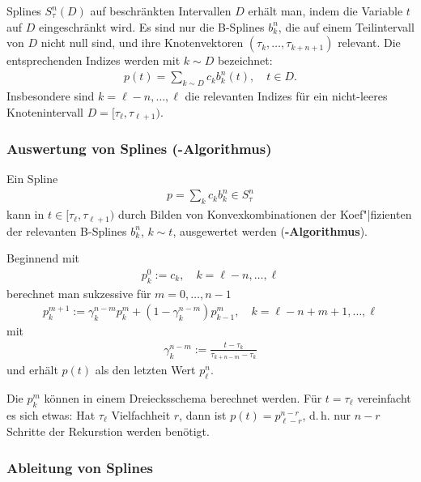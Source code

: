Splines $S_\tau^n(D)$ auf beschränkten Intervallen $D$ erhält man, indem die
Variable $t$ auf $D$ eingeschränkt wird.
Es sind nur die B-Splines $b_k^n$, die auf einem Teilintervall von $D$ nicht
null sind, und ihre Knotenvektoren $(\tau_k, \dotsc, \tau_{k+n+1})$ relevant.
Die entsprechenden Indizes werden mit $k \sim D$ bezeichnet:
\begin{align*}
    p(t) = \sum_{k \sim D} c_k b_k^n(t), \quad t \in D.
\end{align*}
Insbesondere sind $k = \ell - n, \dotsc, \ell$ die relevanten Indizes für ein
nicht-leeres Knotenintervall $D = [\tau_\ell, \tau_{\ell+1})$.

\subsubsection{%
    Auswertung von Splines (-Algorithmus)%
}

Ein Spline
\begin{align*}
    p = \sum_k c_k b_k^n \in S_\tau^n
\end{align*}
kann in $t \in [\tau_\ell, \tau_{\ell+1})$ durch Bilden von Konvexkombinationen
der Koef"|fizienten der relevanten B-Splines $b_k^n$, $k \sim t$,
ausgewertet werden
(\textbf{-Algorithmus}).

Beginnend mit
\begin{align*}
    p_k^0 := c_k, \quad
    k = \ell - n, \dotsc, \ell
\end{align*}
berechnet man sukzessive für $m = 0, \dotsc, n - 1$
\begin{align*}
    p_k^{m+1} := \gamma_k^{n-m} p_k^m + (1 - \gamma_k^{n-m}) p_{k-1}^m, \quad
    k = \ell - n + m + 1, \dotsc, \ell
\end{align*}
mit
\begin{align*}
    \gamma_k^{n-m} := \frac{t - \tau_k}{\tau_{k+n-m} - \tau_k}
\end{align*}
und erhält $p(t)$ als den letzten Wert $p_\ell^n$.

\linie

Die $p_k^m$ können in einem Dreiecksschema berechnet werden.
Für $t = \tau_\ell$ vereinfacht es sich etwas:
Hat $\tau_\ell$ Vielfachheit $r$, dann ist $p(t) = p_{\ell-r}^{n-r}$, d.\,h.
nur $n - r$ Schritte der Rekurstion werden benötigt.

\pagebreak

\subsubsection{%
    Ableitung von Splines%
}


